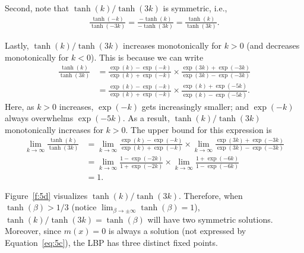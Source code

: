 \documentclass{article}
\newcommand{\qeds}{\hfill\qedsymbol}
\begin{document}
Second, note that $\tanh(k)/\tanh(3k)$ is symmetric, i.e., 
\begin{align*}
	\frac{\tanh(-k)}{\tanh(-3k)} = \frac{-\tanh(k)}{-\tanh(3k)} = \frac{\tanh(k)}{\tanh(3k)}.
\end{align*}

Lastly, $\tanh(k)/\tanh(3k)$ increases monotonically for $k>0$ (and decreases monotonically for $k<0$).
This is  because we can write
\begin{align*}
	\frac{\tanh(k)}{\tanh(3k)} &= \frac{\exp(k) - \exp(-k)}{\exp(k) + \exp(-k)}
	\times\frac{\exp(3k) + \exp(-3k)}{\exp(3k) - \exp(-3k)}\\
	&=\frac{\exp(k) - \exp(-k)}{\exp(k) + \exp(-k)}\times
	\frac{\exp(k) + \exp(-5k)}{\exp(k) - \exp(-5k)}.
\end{align*}
Here, as $k>0$ increases, $\exp(-k)$ gets increasingly smaller; and $\exp(-k)$ always overwhelms $\exp(-5k)$.
As a result, $\tanh(k)/\tanh(3k)$ monotonically increases for $k>0$. The upper bound for this expression is
\begin{align*}
	\lim_{k\to\infty}\frac{\tanh(k)}{\tanh(3k)} &= 
	\lim_{k\to\infty}\frac{\exp(k) - \exp(-k)}{\exp(k) + \exp(-k)}
	\times\lim_{k\to\infty}\frac{\exp(3k) + \exp(-3k)}{\exp(3k) - \exp(-3k)}\\
	&= \lim_{k\to\infty}\frac{1 - \exp(-2k)}{1 + \exp(-2k)}
	\times\lim_{k\to\infty}\frac{1 + \exp(-6k)}{1 - \exp(-6k)}\\
	&= 1.
\end{align*}

Figure~\ref{f:5d} visualizes $\tanh(k)/\tanh(3k)$. Therefore, when $\tanh(\beta) > 1/3$ (notice 
$\lim_{\beta\to\pm\infty}\tanh(\beta)=1$), $\tanh(k)/\tanh(3k) = \tanh(\beta)$ will have two
symmetric solutions. Moreover, since $m(x) = 0$ is always a solution (not expressed by Equation~\eqref{eq:5c}),
the LBP has three distinct fixed points. \qeds
\\
\end{document}
